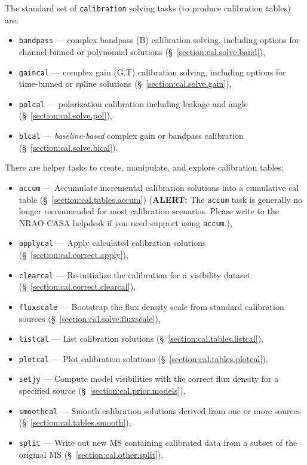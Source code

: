 The standard set of {\tt calibration} solving tasks (to produce
calibration tables) are:
\begin{itemize}
   \item {\tt bandpass} --- complex bandpass (B) calibration solving,
      including options for channel-binned or polynomial solutions
      (\S~\ref{section:cal.solve.band}),
   \item {\tt gaincal} --- complex gain (G,T) calibration solving, 
      including options for time-binned or spline solutions
      (\S~\ref{section:cal.solve.gain}),
   \item {\tt polcal} --- polarization calibration including leakage
      and angle
      (\S~\ref{section:cal.solve.pol}),
   \item {\tt blcal} --- {\it baseline-based} complex gain or bandpass
      calibration
      (\S~\ref{section:cal.solve.blcal}).
\end{itemize}

There are helper tasks to create, manipulate, and explore calibration 
tables:
\begin{itemize}
   \item {\tt accum} --- Accumulate incremental calibration solutions
      into a cumulative cal table (\S~\ref{section:cal.tables.accum})
      ({\bf ALERT:} The {\tt accum} task is generally no longer recommended
      for most calibration scenarios.  Please write to the NRAO CASA
      helpdesk  if you need support using {\tt accum}.),
   \item {\tt applycal} --- Apply calculated calibration solutions
      (\S~\ref{section:cal.correct.apply}),
   \item {\tt clearcal} --- Re-initialize the calibration for a
     visibility dataset (\S~\ref{section:cal.correct.clearcal}),
   \item {\tt fluxscale} --- Bootstrap the flux density scale from
      standard calibration sources (\S~\ref{section:cal.solve.fluxscale}), 
   \item {\tt listcal} --- List calibration solutions 
      (\S~\ref{section:cal.tables.listcal}),
   \item {\tt plotcal} --- Plot calibration solutions 
      (\S~\ref{section:cal.tables.plotcal}),
    \item {\tt setjy} --- Compute model visibilities with the correct
      flux density for a specified source
      (\S~\ref{section:cal.prior.models}),
   \item {\tt smoothcal} --- Smooth calibration solutions derived from
      one or more sources (\S~\ref{section:cal.tables.smooth}),
   \item {\tt split} --- Write out new MS containing calibrated data
      from a subset of the original MS (\S~\ref{section:cal.other.split}).
\end{itemize}

